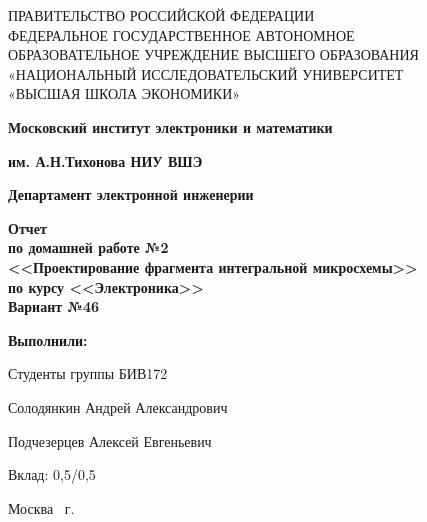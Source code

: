 \begin{titlepage}
	\begin{center}
		ПРАВИТЕЛЬСТВО РОССИЙСКОЙ ФЕДЕРАЦИИ \\
 		ФЕДЕРАЛЬНОЕ  ГОСУДАРСТВЕННОЕ АВТОНОМНОЕ \\
		ОБРАЗОВАТЕЛЬНОЕ УЧРЕЖДЕНИЕ ВЫСШЕГО ОБРАЗОВАНИЯ\\
		«НАЦИОНАЛЬНЫЙ ИССЛЕДОВАТЕЛЬСКИЙ УНИВЕРСИТЕТ\\
		«ВЫСШАЯ ШКОЛА ЭКОНОМИКИ»
	\end{center}
	
	\begin{center}
		\textbf{Московский институт электроники и математики}
		
		\textbf{им. А.Н.Тихонова НИУ ВШЭ}
		
		\vspace{2ex}
		
		\textbf{Департамент электронной инженерии}
	\end{center}
	\vspace{1ex}	
	
	\vspace{1ex}
	\begin{center}
		\textbf{Отчет\\
			по домашней работе №2\\
			<<Проектирование фрагмента интегральной микросхемы>>\\
			по курсу <<Электроника>>\\
			Вариант №46
	}
	\end{center}	

	\vspace{2ex}
	\vfill
	
	\vspace{2ex}
	
	\begin{flushright}
		\textbf{Выполнили:}
		
		\vspace{2ex}
		
		Студенты группы БИВ172
		
		\vspace{2ex}
		
		Солодянкин Андрей Александрович
		
		Подчезерцев Алексей Евгеньевич
		
		\vspace{2ex}
		
		Вклад: 0,5/0,5
	\end{flushright}

	\vspace{5ex}
	\begin{center}
		Москва \the\year \, г.
	\end{center}
	
\end{titlepage}
\addtocounter{page}{1}